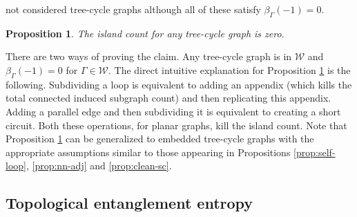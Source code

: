 \documentclass[10pt, reqno]{amsart}
\theoremstyle{plain}
\newtheorem{prop}[theorem]{Proposition}
\theoremstyle{remark}
\theoremstyle{definition}
\numberwithin{equation}{section}
\begin{document}
not considered tree-cycle graphs although all of these satisfy ${\beta}_\Gamma(-1)=0$.
\begin{prop}\label{prop:tree-cycle-gr}
The island count for any tree-cycle graph is zero.
\end{prop}
There are two ways of proving the claim. Any tree-cycle graph is in $\mathcal{W}$ and ${\beta}_\Gamma(-1)=0$ for $\Gamma\in \mathcal{W}$. The direct intuitive explanation for Proposition \ref{prop:tree-cycle-gr} is the following. Subdividing a loop is equivalent to adding an appendix (which kills the total connected induced subgraph count) and then replicating this appendix. Adding a parallel edge and then subdividing it is equivalent to creating a short circuit. Both these operations, for planar graphs, kill the island count. Note that Proposition \ref{prop:tree-cycle-gr} can be generalized to embedded tree-cycle graphs with the appropriate assumptions similar to those appearing in Propositions \ref{prop:self-loop}, \ref{prop:nn-adj} and \ref{prop:clean-sc}.

\subsection{Topological entanglement entropy}\label{subsec:TEE}
\end{document}
